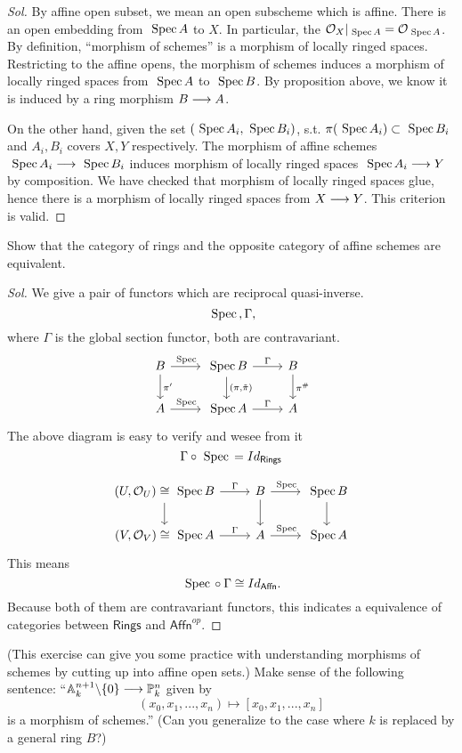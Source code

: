 \documentclass[11pt]{book} %
\begin{document}
\begin{proof}[Sol]
By affine open subset, we mean an open subscheme which is affine. There is an open embedding from $\text{ Spec\,} A$ to $X$. In particular, the ${\cal O}_X|_{\text{ Spec\,} A}={\cal O}_{\text{ Spec\,} A}$. By definition,  ``morphism of schemes'' is a morphism of locally ringed spaces. Restricting to the affine opens, the morphism of schemes induces a morphism of locally ringed spaces from $\text{ Spec\,} A$ to $\text{ Spec\,} B$. By proposition above, we know it is induced by a ring morphism $B\longrightarrow A$.


On the other hand, given the set $(\text{ Spec\,} A_i,\text{ Spec\,} B_i)$, s.t. $\pi(\text{ Spec\,} A_i)\subset\text{ Spec\,} B_i$ and $A_i, B_i$ covers $X, Y$ respectively. 
The morphism of affine schemes $\text{ Spec\,} A_i\longrightarrow \text{ Spec\,} B_i$ induces morphism of locally ringed spaces $\text{ Spec\,} A_i\longrightarrow Y$ by composition. 
We have checked that morphism of locally ringed spaces glue, hence there is a morphism of locally ringed spaces from $X\longrightarrow Y$. This criterion is valid.
\end{proof}
\begin{exr}
Show that the category of rings and the opposite category of affine schemes are equivalent.
\end{exr}
\begin{proof}[Sol]
We give a pair of functors which are reciprocal quasi-inverse.
$$
\text{ Spec\,} ,\Gamma,
$$
where $\Gamma$ is the global section functor, both are contravariant.
$$
\begin{tikzcd}
B \arrow[r, "\spec"] \arrow[d, "\pi'"] & \spec B \arrow[r, "\Gamma"] \arrow[d, "{(\pi,\tilde{\pi})}"] & B \arrow[d, "\pi^\#"] \\
A \arrow[r, "\spec"] & \spec A \arrow[r, "\Gamma"] & A
\end{tikzcd}
$$
The above diagram is easy to verify and wesee from it
$$
\Gamma\circ \text{ Spec\,} =Id_{\mathsf{Rings}}
$$

$$
\begin{tikzcd}
(U,\calo_U)\cong \spec B \arrow[r, "\Gamma"] \arrow[d] & B \arrow[r, "\spec "] \arrow[d] & \spec B \arrow[d] \\
(V,\calo_V)\cong\spec A \arrow[r, "\Gamma"] & A \arrow[r, "\spec"] & \spec A
\end{tikzcd}
$$
This means
$$
\text{ Spec\,}\circ \Gamma\cong Id_{\mathsf{Affn}}.
$$
Because both of them are contravariant functors, this indicates a equivalence of categories between $\mathsf{Rings}$ and $\mathsf{Affn}^{op}$.

\end{proof}
\begin{exr}
(This exercise can give you some practice with understanding morphisms of schemes by cutting up into affine open sets.) Make sense of the following sentence: ``$ \mathbb A^{n+1}_k\backslash \{0\}\longrightarrow \mathbb P^n_k$ given by 
$$
(x_0,x_1,...,x_n)\mapsto[x_0,x_1,...,x_n]
$$
is a morphism of schemes.''
(Can you generalize to the case where $k$ is replaced by a general ring $B$?)
\end{exr}
\end{document}
